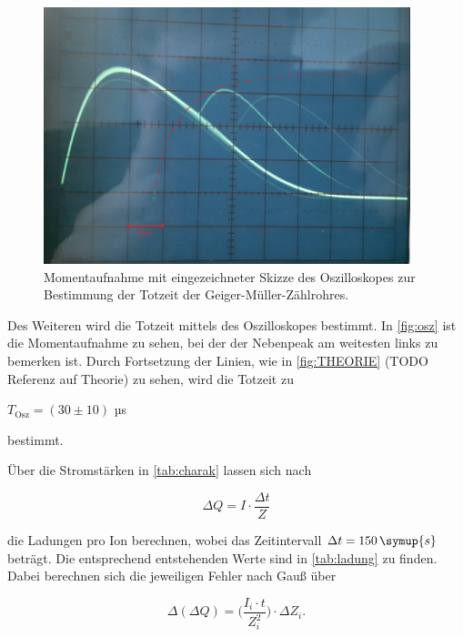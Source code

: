 \begin{figure}
  \centering
  \includegraphics[width=0.95\textwidth]{content/osz_m_skizze.png}
  \caption{Momentaufnahme mit eingezeichneter Skizze des Oszilloskopes zur Bestimmung der Totzeit der Geiger-Müller-Zählrohres.}
  \label{fig:osz-m-skizze}
\end{figure}

Des Weiteren wird die Totzeit mittels des Oszilloskopes bestimmt. In \autoref{fig:osz} ist die Momentaufnahme zu sehen, bei der der Nebenpeak am weitesten links zu bemerken ist.
Durch Fortsetzung der Linien, wie in \autoref{fig:THEORIE} (TODO Referenz auf Theorie) zu sehen, wird die Totzeit zu

\begin{center}
    $T_\text{Osz} = (30 \pm 10)$ µs
\end{center}

bestimmt.

Über die Stromstärken in \autoref{tab:charak} lassen sich nach 

\begin{equation}
    \Delta Q = I \cdot \frac{\Delta t}{Z}
\end{equation}

die Ladungen pro Ion berechnen, 
wobei das Zeitintervall $\Delta t = 150 \, \symup{s}$ beträgt.
Die entsprechend entstehenden Werte sind in \autoref{tab:ladung} zu finden.
Dabei berechnen sich die jeweiligen Fehler nach Gauß über

\begin{equation}
    \Delta (\Delta Q) = \bigg( \frac{I_i \cdot t}{Z_i^2} \bigg) \cdot \Delta Z_i.
\end{equation}

